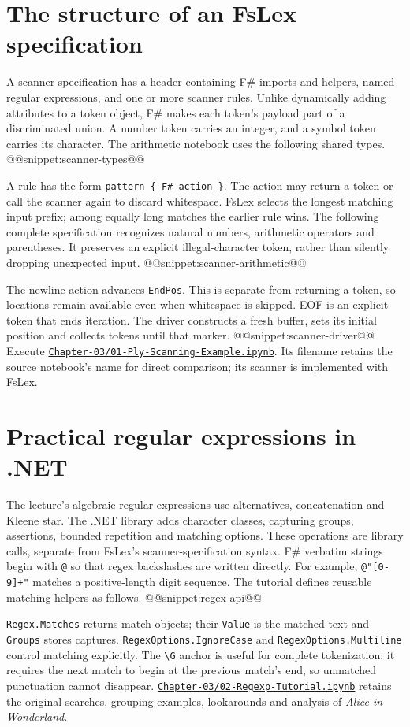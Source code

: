 \section{The structure of an FsLex specification}
A scanner specification has a header containing F\# imports and helpers, named regular expressions, and one or more scanner rules.
Unlike dynamically adding attributes to a token object, F\# makes each token's payload part of a discriminated union.
A number token carries an integer, and a symbol token carries its character.
The arithmetic notebook uses the following shared types.
@@snippet:scanner-types@@

A rule has the form \texttt{pattern \{ F\# action \}}.
The action may return a token or call the scanner again to discard whitespace.
FsLex selects the longest matching input prefix; among equally long matches the earlier rule wins.
The following complete specification recognizes natural numbers, arithmetic operators and parentheses.
It preserves an explicit illegal-character token, rather than silently dropping unexpected input.
@@snippet:scanner-arithmetic@@

The newline action advances \texttt{EndPos}.
This is separate from returning a token, so locations remain available even when whitespace is skipped.
EOF is an explicit token that ends iteration.
The driver constructs a fresh buffer, sets its initial position and collects tokens until that marker.
@@snippet:scanner-driver@@
\noindent Execute \href{../../Chapter-03/01-Ply-Scanning-Example.ipynb}{\nolinkurl{Chapter-03/01-Ply-Scanning-Example.ipynb}}.
Its filename retains the source notebook's name for direct comparison; its scanner is implemented with FsLex.

\section{Practical regular expressions in .NET}
The lecture's algebraic regular expressions use alternatives, concatenation and Kleene star.
The .NET library adds character classes, capturing groups, assertions, bounded repetition and matching options.
These operations are library calls, separate from FsLex's scanner-specification syntax.
F\# verbatim strings begin with \texttt{@} so that regex backslashes are written directly.
For example, \texttt{@"[0-9]+"} matches a positive-length digit sequence.
The tutorial defines reusable matching helpers as follows.
@@snippet:regex-api@@

\texttt{Regex.Matches} returns match objects; their \texttt{Value} is the matched text and \texttt{Groups} stores captures.
\texttt{RegexOptions.IgnoreCase} and \texttt{RegexOptions.Multiline} control matching explicitly.
The \texttt{\textbackslash G} anchor is useful for complete tokenization: it requires the next match to begin at the previous match's end, so unmatched punctuation cannot disappear.
\href{../../Chapter-03/02-Regexp-Tutorial.ipynb}{\nolinkurl{Chapter-03/02-Regexp-Tutorial.ipynb}} retains the original searches, grouping examples, lookarounds and analysis of \textsl{Alice in Wonderland}.

